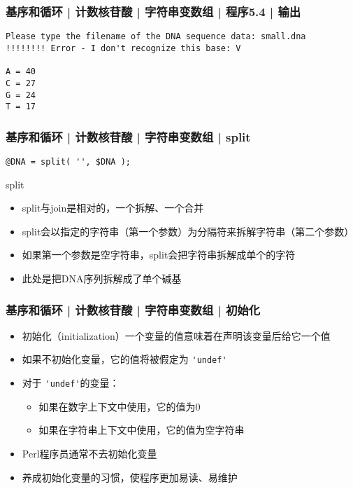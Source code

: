 \begin{frame}[fragile]
  \frametitle{基序和循环 | 计数核苷酸 | 字符串变数组 | 程序5.4 | 输出}
\begin{lstlisting}
Please type the filename of the DNA sequence data: small.dna
!!!!!!!! Error - I don't recognize this base: V

A = 40
C = 27
G = 24
T = 17
\end{lstlisting}
\end{frame}

\begin{frame}[fragile]
  \frametitle{基序和循环 | 计数核苷酸 | 字符串变数组 | \alert{split}}
\begin{lstlisting}
@DNA = split( '', $DNA );
\end{lstlisting}
\pause
\begin{block}{split}
  \begin{itemize}
    \item split与join是相对的，一个拆解、一个合并
    \item split会以指定的字符串（第一个参数）为分隔符来拆解字符串（第二个参数）
    \item 如果第一个参数是空字符串，split会把字符串拆解成单个的字符
    \item 此处是把DNA序列拆解成了单个碱基
  \end{itemize}
\end{block}
\end{frame}

\begin{frame}[fragile]
  \frametitle{基序和循环 | 计数核苷酸 | 字符串变数组 | \alert{初始化}}
  \begin{itemize}
    \item 初始化（initialization）一个变量的值意味着在声明该变量后给它一个值
    \item 如果不初始化变量，它的值将被假定为 \verb|'undef'|
    \item 对于 \verb|'undef'|的变量：
      \begin{itemize}
	\item 如果在数字上下文中使用，它的值为0
	\item 如果在字符串上下文中使用，它的值为空字符串
      \end{itemize}
    \item Perl程序员通常不去初始化变量
    \item 养成初始化变量的习惯，使程序更加易读、易维护
  \end{itemize}
\end{frame}

